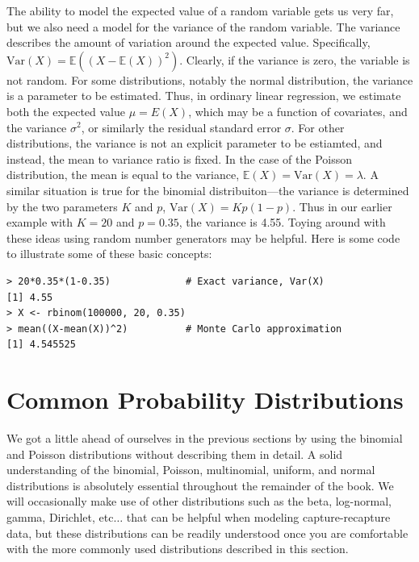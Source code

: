 The ability to model the expected value of a random variable gets us
very far, but we also need a model for the variance of the random
variable. The variance %
describes the amount of variation around the expected
value. Specifically, $\text{Var}(X) = \mathbb{E}((X -
\mathbb{E}(X))^2)$. Clearly, if the variance is zero, the variable is
not random.
For some distributions, notably the normal distribution, the variance
is a parameter to be estimated. Thus, in ordinary linear regression,
we estimate both the expected value $\mu=E(X)$,
which may be a function of covariates, and the variance
$\sigma^2$, or similarly the residual standard error $\sigma$. For
other distributions, the variance is not an explicit parameter to be
estiamted, and instead, the mean to variance ratio is fixed. In the
case of the Poisson distribution, the mean is equal to the
variance, $\mathbb{E}(X) = \text{Var}(X) = \lambda$.
A similar
situation is true for the binomial distribuiton---the variance is
determined by the two parameters $K$ and $p$, $\text{Var}(X) = Kp(1-p)$. Thus
in our earlier example with $K=20$ and $p=0.35$, the variance is
4.55. Toying around with these ideas using random number generators
may be helpful. Here is some code to illustrate some of these basic concepts:
\begin{verbatim}
> 20*0.35*(1-0.35)             # Exact variance, Var(X)
[1] 4.55
> X <- rbinom(100000, 20, 0.35)
> mean((X-mean(X))^2)          # Monte Carlo approximation
[1] 4.545525
\end{verbatim}



\section{Common Probability Distributions}
\label{sec.modeling.distributions}

We got a little ahead of ourselves in the previous sections by using
the binomial and Poisson distributions without describing them in detail.
A solid understanding of the binomial, Poisson, multinomial, uniform,
and normal
distributions is absolutely essential throughout the
remainder of the book. We will occasionally make use of other
distributions such as the %
beta, log-normal, %
gamma, Dirichlet, etc$\dots$ that can be helpful when
modeling capture-recapture data, but these distributions can be
readily understood once you are comfortable with the more commonly
used distributions described in this section.

